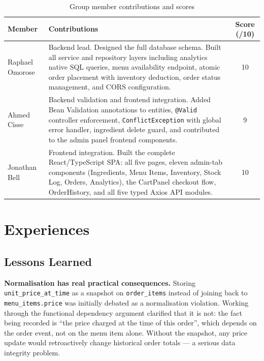 \documentclass[12pt,a4paper]{article}
\begin{document}
\begin{table}[H]
\centering
\caption{Group member contributions and scores}
\label{tab:team}
\renewcommand{\arraystretch}{1.4}
\begin{tabular}{@{}p{3.2cm}p{9cm}c@{}}
\toprule
\textbf{Member} & \textbf{Contributions} & \textbf{Score (/10)} \\
\midrule
Raphael Omorose
    & Backend lead. Designed the full database schema. Built all service and
      repository layers including analytics native SQL queries, menu availability
      endpoint, atomic order placement with inventory deduction, order status
      management, and CORS configuration.
    & 10 \\

Ahmed Cisse
    & Backend validation and frontend integration. Added Bean Validation
      annotations to entities, \texttt{@Valid} controller enforcement,
      \texttt{ConflictException} with global error handler, ingredient delete
      guard, and contributed to the admin panel frontend components.
    & 9 \\

Jonathan Bell
    & Frontend integration. Built the complete React/TypeScript SPA: all five
      pages, eleven admin-tab components (Ingredients, Menu Items, Inventory,
      Stock Log, Orders, Analytics), the CartPanel checkout flow, OrderHistory,
      and all five typed Axios API modules.
    & 10 \\
\bottomrule
\end{tabular}
\end{table}

\section{Experiences}

\subsection{Lessons Learned}

\textbf{Normalisation has real practical consequences.}
Storing \texttt{unit\_price\_at\_time} as a snapshot on \texttt{order\_items}
instead of joining back to \texttt{menu\_items.price} was initially debated as a
normalisation violation. Working through the functional dependency argument
clarified that it is not: the fact being recorded is ``the price charged at the
time of this order'', which depends on the order event, not on the menu item
alone. Without the snapshot, any price update would retroactively change
historical order totals --- a serious data integrity problem.
\end{document}
